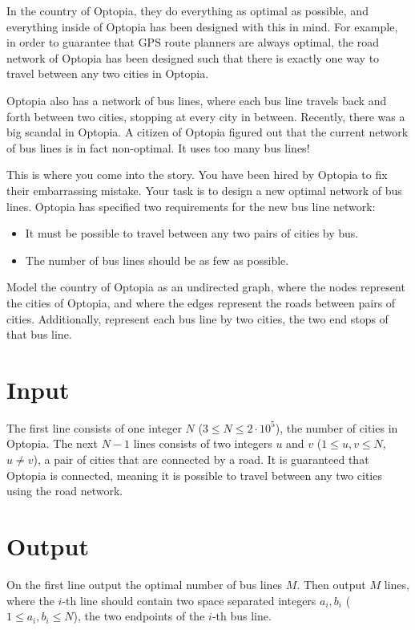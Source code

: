 

In the country of Optopia, they do everything as optimal as possible, 
and everything inside of Optopia has been designed with this in mind.
For example, in order to guarantee that GPS route planners 
are always optimal, the road network of Optopia has been designed 
such that there is exactly one way to travel between any two cities in Optopia.

Optopia also has a network of bus lines, where each 
bus line travels back and forth between two cities, 
stopping at every city in between.
Recently, there was a big scandal in Optopia. 
A citizen of Optopia figured out that 
the current network of bus lines is in fact non-optimal.
It uses too many bus lines!

This is where you come into the story. You have been hired 
by Optopia to fix their embarrassing mistake. 
Your task is to design a new optimal network of bus lines.
Optopia has specified two requirements for the new bus line network: 
\begin{itemize}
	\item It must be possible to travel between any two pairs of cities by bus.
	\item The number of bus lines should be as few as possible.
\end{itemize}

Model the country of Optopia as an undirected graph, where
the nodes represent the cities of Optopia, and where the edges 
represent the roads between pairs of cities. Additionally, represent
each bus line by two cities, the two end stops of that bus line.

\section*{Input}
The first line consists of one integer $N$ ($3 \leq N \leq 2 \cdot 10^5$), the number of cities in Optopia.
The next $N-1$ lines consists of two integers $u$ and $v$ ($1 \leq u,v \leq N$, $u \neq v$), a pair of cities that are connected by a road.
It is guaranteed that Optopia is connected, meaning it is possible to travel between any two cities using the road network. 

\section*{Output}
On the first line output the optimal number of bus lines $M$.
Then output $M$ lines, where the $i$-th line should contain two space separated integers $a_i, b_i$ ($1 \leq a_i, b_i \leq N$), the two endpoints of the $i$-th bus line. 
